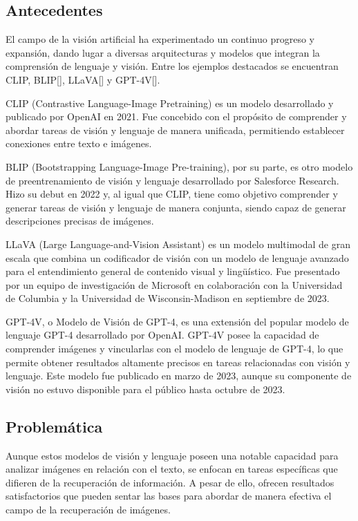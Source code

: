 \subsection*{Antecedentes}
El campo de la visi\'on artificial ha experimentado un continuo progreso y expansi\'on, dando lugar a diversas arquitecturas y modelos que integran la comprensi\'on de lenguaje y visi\'on. Entre los ejemplos destacados se encuentran CLIP, BLIP[\cite{blip}], LLaVA[\cite{llava}] y GPT-4V[\cite{gpt-4v}].

CLIP (Contrastive Language-Image Pretraining) es un modelo desarrollado y publicado por OpenAI en 2021. Fue concebido con el prop\'osito de comprender y abordar tareas de visi\'on y lenguaje de manera unificada, permitiendo establecer conexiones entre texto e im\'agenes.

BLIP (Bootstrapping Language-Image Pre-training), por su parte, es otro modelo de preentrenamiento de visi\'on y lenguaje desarrollado por Salesforce Research. Hizo su debut en 2022 y, al igual que CLIP, tiene como objetivo comprender y generar tareas de visi\'on y lenguaje de manera conjunta, siendo capaz de generar descripciones precisas de im\'agenes.

LLaVA (Large Language-and-Vision Assistant) es un modelo multimodal de gran escala que combina un codificador de visi\'on con un modelo de lenguaje avanzado para el entendimiento general de contenido visual y lingü\'istico. Fue presentado por un equipo de investigaci\'on de Microsoft en colaboraci\'on con la Universidad de Columbia y la Universidad de Wisconsin-Madison en septiembre de 2023.

GPT-4V, o Modelo de Visi\'on de GPT-4, es una extensi\'on del popular modelo de lenguaje GPT-4 desarrollado por OpenAI. GPT-4V posee la capacidad de comprender im\'agenes y vincularlas con el modelo de lenguaje de GPT-4, lo que permite obtener resultados altamente precisos en tareas relacionadas con visi\'on y lenguaje. Este modelo fue publicado en marzo de 2023, aunque su componente de visi\'on no estuvo disponible para el p\'ublico hasta octubre de 2023.

\subsection*{Problem\'atica}
Aunque estos modelos de visi\'on y lenguaje poseen una notable capacidad para analizar im\'agenes en relaci\'on con el texto, se enfocan en tareas espec\'ificas que difieren de la recuperaci\'on de informaci\'on. A pesar de ello, ofrecen resultados satisfactorios que pueden sentar las bases para abordar de manera efectiva el campo de la recuperaci\'on de im\'agenes.


